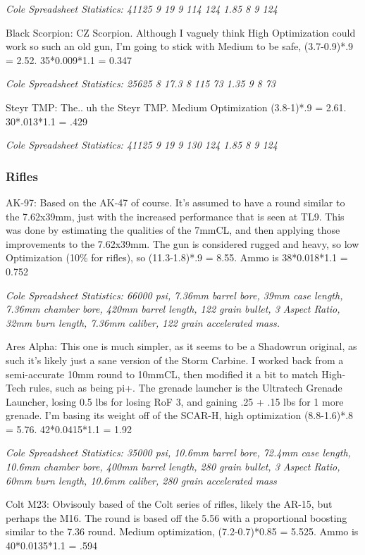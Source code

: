 \begin{multicols*}{2}
	\textit{\textcolor{OliveGreen}{Cole Spreadsheet Statistics: 41125 9 19 9 114 124 1.85 8 9 124}}
	
	Black Scorpion: CZ Scorpion. Although I vaguely think High Optimization could work so such an old gun, I'm going to stick with Medium to be safe, (3.7-0.9)*.9 = 2.52. 35*0.009*1.1 = 0.347
	
	\textit{\textcolor{OliveGreen}{Cole Spreadsheet Statistics: 25625 8 17.3 8 115 73 1.35 9 8 73}}
	
	Steyr TMP: The.. uh the Steyr TMP. Medium Optimization (3.8-1)*.9 = 2.61. 30*.013*1.1 = .429
	
	\textit{\textcolor{OliveGreen}{Cole Spreadsheet Statistics: 41125 9 19 9 130 124 1.85 8 9 124}}
	
	\subsubsection{Rifles}
	
	AK-97: Based on the AK-47 of course. It's assumed to have a round similar to the 7.62x39mm, just with the increased performance that is seen at TL9. This was done by estimating the qualities of the 7mmCL, and then applying those improvements to the 7.62x39mm. The gun is considered rugged and heavy, so low Optimization (10\% for rifles), so (11.3-1.8)*.9 = 8.55. Ammo is 38*0.018*1.1 = 0.752
	
	\textit{\textcolor{OliveGreen}{Cole Spreadsheet Statistics: 66000 psi, 7.36mm barrel bore, 39mm case length, 7.36mm chamber bore, 420mm barrel length, 122 grain bullet, 3 Aspect Ratio, 32mm burn length, 7.36mm caliber, 122 grain accelerated mass.}}
	
	Ares Alpha: This one is much simpler, as it seems to be a Shadowrun original, as such it's likely just a sane version of the Storm Carbine. I worked back from a semi-accurate 10mm round to 10mmCL, then modified it a bit to match High-Tech rules, such as being pi+. The grenade launcher is the Ultratech Grenade Launcher, losing 0.5 lbs for losing RoF 3, and gaining .25 + .15 lbs for 1 more grenade. I'm basing its weight off of the SCAR-H, high optimization (8.8-1.6)*.8 = 5.76. 42*0.0415*1.1 = 1.92
	
	\textit{\textcolor{OliveGreen}{Cole Spreadsheet Statistics: 35000 psi, 10.6mm barrel bore, 72.4mm case length, 10.6mm chamber bore, 400mm barrel length, 280 grain bullet, 3 Aspect Ratio, 60mm burn length, 10.6mm caliber, 280 grain accelerated mass}}
	
	Colt M23: Obvisouly based of the Colt series of rifles, likely the AR-15, but perhaps the M16. The round is based off the 5.56 with a proportional boosting similar to the 7.36 round. Medium optimization, (7.2-0.7)*0.85 = 5.525. Ammo is 40*0.0135*1.1 = .594
	

\end{multicols*}

